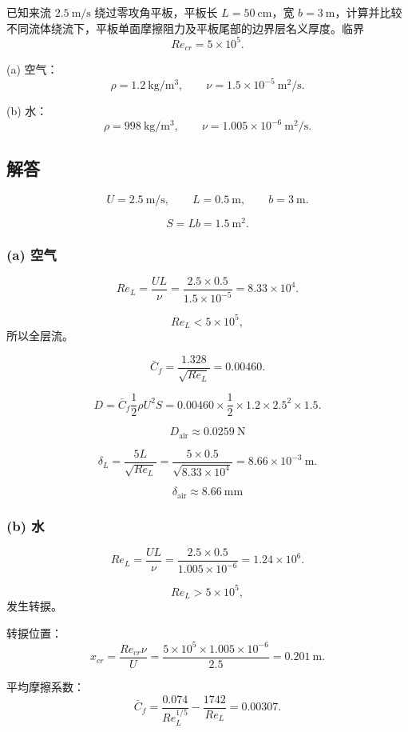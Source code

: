 \documentclass[11pt,a4paper]{ctexart}
\begin{document}
已知来流 \(2.5\ \mathrm{m/s}\) 绕过零攻角平板，平板长 \(L=50\ \mathrm{cm}\)，宽 \(b=3\ \mathrm{m}\)，计算并比较不同流体绕流下，平板单面摩擦阻力及平板尾部的边界层名义厚度。临界
\[
Re_{cr}=5\times10^5.
\]

(a) 空气：
\[
\rho=1.2\ \mathrm{kg/m^3},\qquad \nu=1.5\times10^{-5}\ \mathrm{m^2/s}.
\]

(b) 水：
\[
\rho=998\ \mathrm{kg/m^3},\qquad \nu=1.005\times10^{-6}\ \mathrm{m^2/s}.
\]

\subsection*{解答}

\[
U=2.5\ \mathrm{m/s},\qquad L=0.5\ \mathrm{m},\qquad b=3\ \mathrm{m}.
\]

\[
S=Lb=1.5\ \mathrm{m^2}.
\]

\subsubsection*{(a) 空气}

\[
Re_L=\frac{UL}{\nu}
=\frac{2.5\times0.5}{1.5\times10^{-5}}
=8.33\times10^4.
\]

\[
Re_L<5\times10^5,
\]
所以全层流。

\[
\bar C_f=\frac{1.328}{\sqrt{Re_L}}
=0.00460.
\]

\[
D=\bar C_f\frac12\rho U^2S
=0.00460\times\frac12\times1.2\times2.5^2\times1.5.
\]

\[
\boxed{D_{\mathrm{air}}\approx0.0259\ \mathrm{N}}
\]

\[
\delta_L=\frac{5L}{\sqrt{Re_L}}
=\frac{5\times0.5}{\sqrt{8.33\times10^4}}
=8.66\times10^{-3}\ \mathrm{m}.
\]

\[
\boxed{\delta_{\mathrm{air}}\approx8.66\ \mathrm{mm}}
\]

\subsubsection*{(b) 水}

\[
Re_L=\frac{UL}{\nu}
=\frac{2.5\times0.5}{1.005\times10^{-6}}
=1.24\times10^6.
\]

\[
Re_L>5\times10^5,
\]
发生转捩。

转捩位置：
\[
x_{cr}=\frac{Re_{cr}\nu}{U}
=\frac{5\times10^5\times1.005\times10^{-6}}{2.5}
=0.201\ \mathrm{m}.
\]

平均摩擦系数：
\[
\bar C_f=\frac{0.074}{Re_L^{1/5}}-\frac{1742}{Re_L}
=0.00307.
\]
\end{document}
